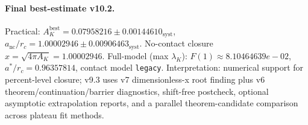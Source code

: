 \paragraph{Final best-estimate v10.2.}
Practical: $A_K^{\mathrm{best}} = 0.07958216 \pm 0.00144610_{\mathrm{syst}}$, $a_{\mathrm{nc}}/r_c = 1.00002946 \pm 0.00906463_{\mathrm{syst}}$.
No-contact closure $x = \sqrt{4\pi A_K} = 1.00002946$.
Full-model (max $\lambda_K$): $F(1) \approx 8.10464639e-02$, $a^*/r_c = 0.96357814$, contact model \texttt{legacy}.
Interpretation: numerical support for percent-level closure; v9.3 uses v7 dimensionless-x root finding plus v6 theorem/continuation/barrier diagnostics, shift-free postcheck, optional asymptotic extrapolation reports, and a parallel theorem-candidate comparison across plateau fit methods.
